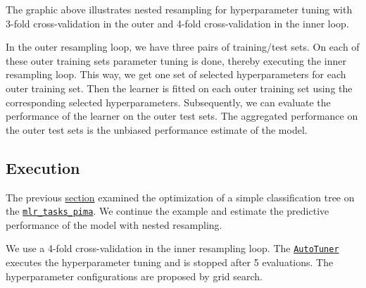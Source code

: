 \documentclass[
]{scrbook}
\newenvironment{Shaded}{\begin{snugshade}}{\end{snugshade}}
\newcommand{\AttributeTok}[1]{\textcolor[rgb]{0.77,0.63,0.00}{#1}}
\newcommand{\DecValTok}[1]{\textcolor[rgb]{0.00,0.00,0.81}{#1}}
\newcommand{\FloatTok}[1]{\textcolor[rgb]{0.00,0.00,0.81}{#1}}
\newcommand{\FunctionTok}[1]{\textcolor[rgb]{0.00,0.00,0.00}{#1}}
\newcommand{\NormalTok}[1]{#1}
\newcommand{\OtherTok}[1]{\textcolor[rgb]{0.56,0.35,0.01}{#1}}
\newcommand{\SpecialCharTok}[1]{\textcolor[rgb]{0.00,0.00,0.00}{#1}}
\newcommand{\StringTok}[1]{\textcolor[rgb]{0.31,0.60,0.02}{#1}}
\renewenvironment{Shaded} {\begin{snugshade}\small} {\end{snugshade}}
\begin{document}
The graphic above illustrates nested resampling for hyperparameter tuning with 3-fold cross-validation in the outer and 4-fold cross-validation in the inner loop.

In the outer resampling loop, we have three pairs of training/test sets.
On each of these outer training sets parameter tuning is done, thereby executing the inner resampling loop.
This way, we get one set of selected hyperparameters for each outer training set.
Then the learner is fitted on each outer training set using the corresponding selected hyperparameters.
Subsequently, we can evaluate the performance of the learner on the outer test sets.
The aggregated performance on the outer test sets is the unbiased performance estimate of the model.

\hypertarget{nested-resamp-exec}{%
\subsection{Execution}\label{nested-resamp-exec}}

The previous \protect\hyperlink{tuning}{section} examined the optimization of a simple classification tree on the \href{https://mlr3.mlr-org.com/reference/mlr_tasks_pima.html}{\texttt{mlr\_tasks\_pima}}.
We continue the example and estimate the predictive performance of the model with nested resampling.

We use a 4-fold cross-validation in the inner resampling loop.
The \href{https://mlr3tuning.mlr-org.com/reference/AutoTuner.html}{\texttt{AutoTuner}} executes the hyperparameter tuning and is stopped after 5 evaluations.
The hyperparameter configurations are proposed by grid search.

\begin{Shaded}
\end{Shaded}
\end{document}

